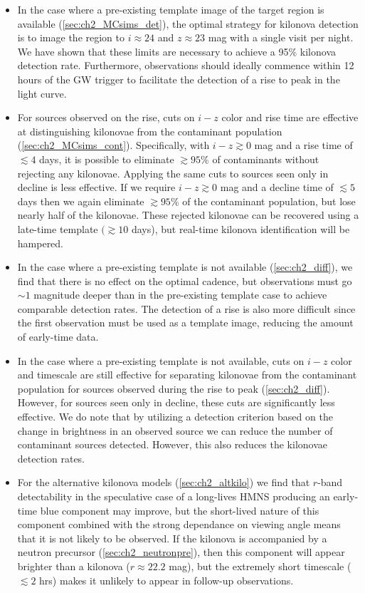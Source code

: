 \begin{itemize}
\item In the case where a pre-existing template image of the target region is available (\cref{sec:ch2_MCsims_det}), the optimal strategy for kilonova detection is to image the region to $i\approx 24$ and $z\approx 23$ mag with a single visit per night. We have shown that these limits are necessary to achieve a 95\% kilonova detection rate. Furthermore, observations should ideally commence within 12 hours of the GW trigger to facilitate the detection of a rise to peak in the light curve. 
\item For sources observed on the rise, cuts on $i-z$ color and rise time are effective at distinguishing kilonovae from the contaminant population (\cref{sec:ch2_MCsims_cont}). Specifically, with $i-z\gtrsim0$ mag and a rise time of $\lesssim 4$ days, it is possible to eliminate $\gtrsim95\%$ of contaminants without rejecting any kilonovae. Applying the same cuts to sources seen only in decline is less effective. If we require $i-z\gtrsim0$ mag and a decline time of $\lesssim5$ days then we again eliminate $\gtrsim95\%$ of the contaminant population, but lose nearly half of the kilonovae. These rejected kilonovae can be recovered using a late-time template $(\gtrsim10$ days), but real-time kilonova identification will be hampered.
\item In the case where a pre-existing template is not available (\cref{sec:ch2_diff}), we find that there is no effect on the optimal cadence, but observations must go $\sim1$ magnitude deeper than in the pre-existing template case to achieve comparable detection rates. The detection of a rise is also more difficult since the first observation must be used as a template image, reducing the amount of early-time data.
\item In the case where a pre-existing template is not available, cuts on $i-z$ color and timescale are still effective for separating kilonovae from the contaminant population for sources observed during the rise to peak (\cref{sec:ch2_diff}). However, for sources seen only in decline, these cuts are significantly less effective. We do note that by utilizing a detection criterion based on the change in brightness in an observed source we can reduce the number of contaminant sources detected. However, this also reduces the kilonovae detection rates. 
\item For the alternative kilonova models (\cref{sec:ch2_altkilo}) we find that $r$-band detectability in the speculative case of a long-lives HMNS producing an early-time blue component may improve, but the short-lived nature of this component combined with the strong dependance on viewing angle means that it is not likely to be observed. If the kilonova is accompanied by a neutron precursor (\cref{sec:ch2_neutronpre}), then this component will appear brighter than a kilonova ($r\approx22.2$ mag), but the extremely short timescale ($\lesssim2$ hrs) makes it unlikely to appear in follow-up observations.

\end{itemize}
